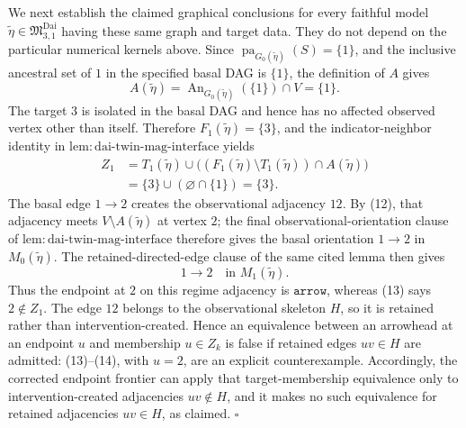 We next establish the claimed graphical conclusions for every faithful model \(\widetilde\eta\in\mathfrak M_{3,1}^{\mathrm{Dai}}\) having these same graph and target data.  They do not depend on the particular numerical kernels above.  Since \(\operatorname{pa}_{G_0(\widetilde\eta)}(S)=\{1\}\), and the inclusive ancestral set of \(1\) in the specified basal DAG is \(\{1\}\), the definition of \(A\) gives
\[
 A(\widetilde\eta)
 =\operatorname{An}_{G_0(\widetilde\eta)}(\{1\})\cap V
 =\{1\}.
 \tag{12}
\]
The target \(3\) is isolated in the basal DAG and hence has no affected observed vertex other than itself.  Therefore \(F_1(\widetilde\eta)=\{3\}\), and the indicator-neighbor identity in \(\mathrm{lem:dai\mbox{-}twin\mbox{-}mag\mbox{-}interface}\) yields
\[
 \begin{aligned}
 Z_1
 &=T_1(\widetilde\eta)\cup
   \bigl((F_1(\widetilde\eta)\setminus T_1(\widetilde\eta))
          \cap A(\widetilde\eta)\bigr)\\
 &=\{3\}\cup(\varnothing\cap\{1\})
 =\{3\}.
 \end{aligned}
 \tag{13}
\]
The basal edge \(1\to2\) creates the observational adjacency \(12\).  By (12), that adjacency meets \(V\setminus A(\widetilde\eta)\) at vertex \(2\); the final observational-orientation clause of \(\mathrm{lem:dai\mbox{-}twin\mbox{-}mag\mbox{-}interface}\) therefore gives the basal orientation \(1\to2\) in \(M_0(\widetilde\eta)\).  The retained-directed-edge clause of the same cited lemma then gives
\[
 1\to2\quad\text{in }M_1(\widetilde\eta).
 \tag{14}
\]
Thus the endpoint at \(2\) on this regime adjacency is \(\mathtt{arrow}\), whereas (13) says \(2\notin Z_1\).  The edge \(12\) belongs to the observational skeleton \(H\), so it is retained rather than intervention-created.  Hence an equivalence between an arrowhead at an endpoint \(u\) and membership \(u\in Z_k\) is false if retained edges \(uv\in H\) are admitted: (13)--(14), with \(u=2\), are an explicit counterexample.  Accordingly, the corrected endpoint frontier can apply that target-membership equivalence only to intervention-created adjacencies \(uv\notin H\), and it makes no such equivalence for retained adjacencies \(uv\in H\), as claimed.  \(\square\)
